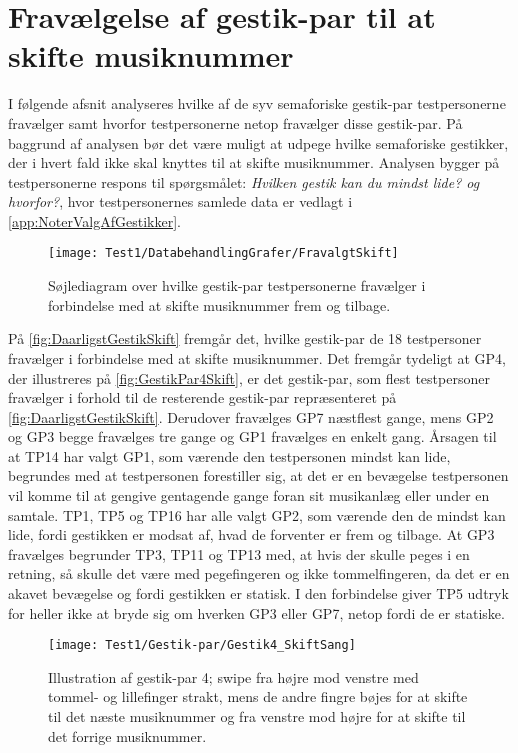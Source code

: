 \section{Fravælgelse af gestik-par til at skifte musiknummer}
\label{app:TestresultaterSkiftDaarlig}
%
I følgende afsnit analyseres hvilke af de syv semaforiske gestik-par testpersonerne fravælger samt hvorfor testpersonerne netop fravælger disse gestik-par. På baggrund af analysen bør det være muligt at udpege hvilke semaforiske gestikker, der i hvert fald ikke skal knyttes til at skifte musiknummer. Analysen bygger på testpersonerne respons til spørgsmålet: \textit{Hvilken gestik kan du mindst lide? og hvorfor?}, hvor testpersonernes samlede data er vedlagt i \autoref{app:NoterValgAfGestikker}.
%
\begin{figure}[H]
	\centering
	\texttt{[image: Test1/DatabehandlingGrafer/FravalgtSkift]}
	\caption{Søjlediagram over hvilke gestik-par testpersonerne fravælger i forbindelse med at skifte musiknummer frem og tilbage.}
	\label{fig:DaarligstGestikSkift}
\end{figure}
\noindent
%
På \autoref{fig:DaarligstGestikSkift} fremgår det, hvilke gestik-par de 18 testpersoner fravælger i forbindelse med at skifte musiknummer. Det fremgår tydeligt at GP4, der illustreres på \autoref{fig:GestikPar4Skift}, er det gestik-par, som flest testpersoner fravælger i forhold til de resterende gestik-par repræsenteret på \autoref{fig:DaarligstGestikSkift}. Derudover fravælges GP7 næstflest gange, mens GP2 og GP3 begge fravælges tre gange og GP1 fravælges en enkelt gang. Årsagen til at TP14 har valgt GP1, som værende den testpersonen mindst kan lide, begrundes med at testpersonen forestiller sig, at det er en bevægelse testpersonen vil komme til at gengive gentagende gange foran sit musikanlæg eller under en samtale. TP1, TP5 og TP16 har alle valgt GP2, som værende den de mindst kan lide, fordi gestikken er modsat af, hvad de forventer er frem og tilbage. At GP3 fravælges begrunder TP3, TP11 og TP13 med, at hvis der skulle peges i en retning, så skulle det være med pegefingeren og ikke tommelfingeren, da det er en akavet bevægelse og fordi gestikken er statisk. I den forbindelse giver TP5 udtryk for heller ikke at bryde sig om hverken GP3 eller GP7, netop fordi de er statiske.
%
\begin{figure}[H]
	\centering
	\texttt{[image: Test1/Gestik-par/Gestik4\_SkiftSang]}
	\caption{Illustration af gestik-par 4; swipe fra højre mod venstre med tommel- og lillefinger strakt, mens de andre fingre bøjes for at skifte til det næste musiknummer og fra venstre mod højre for at skifte til det forrige musiknummer.}
	\label{fig:GestikPar4Skift}
\end{figure}
